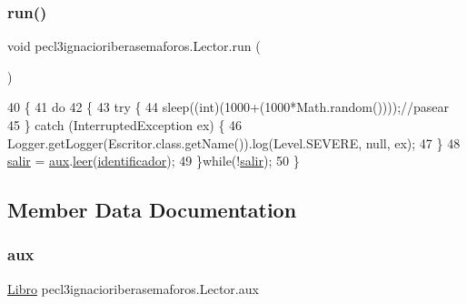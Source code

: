 \subsubsection{\texorpdfstring{run()}{run()}}
{\footnotesize\ttfamily void pecl3ignacioriberasemaforos.\+Lector.\+run (\begin{DoxyParamCaption}{ }\end{DoxyParamCaption})\hspace{0.3cm}{\ttfamily [inline]}}


\begin{DoxyCode}
40      \{
41          \textcolor{keywordflow}{do}
42          \{
43              \textcolor{keywordflow}{try} \{
44                 sleep((\textcolor{keywordtype}{int})(1000+(1000*Math.random())));\textcolor{comment}{//pasear}
45             \} \textcolor{keywordflow}{catch} (InterruptedException ex) \{
46                 Logger.getLogger(Escritor.class.getName()).log(Level.SEVERE, null, ex);
47             \}
48             \mbox{\hyperlink{classpecl3ignacioriberasemaforos_1_1_lector_a9ddf4d7dbf4e433502e0df3ea9862eaf}{salir}} = \mbox{\hyperlink{classpecl3ignacioriberasemaforos_1_1_lector_a3fc7cbee0daccfbbb55d9922817b438a}{aux}}.\mbox{\hyperlink{classpecl3ignacioriberasemaforos_1_1_libro_a0c0063019147f6501b2216621ee020ce}{leer}}(\mbox{\hyperlink{classpecl3ignacioriberasemaforos_1_1_lector_a63b92fb248e0937e631b8c140de16562}{identificador}});
49          \}\textcolor{keywordflow}{while}(!\mbox{\hyperlink{classpecl3ignacioriberasemaforos_1_1_lector_a9ddf4d7dbf4e433502e0df3ea9862eaf}{salir}});
50      \}
\end{DoxyCode}


\subsection{Member Data Documentation}
\mbox{\label{classpecl3ignacioriberasemaforos_1_1_lector_a3fc7cbee0daccfbbb55d9922817b438a}} 
\subsubsection{\texorpdfstring{aux}{aux}}
{\footnotesize\ttfamily \mbox{\hyperlink{classpecl3ignacioriberasemaforos_1_1_libro}{Libro}} pecl3ignacioriberasemaforos.\+Lector.\+aux\hspace{0.3cm}{\ttfamily [package]}}

